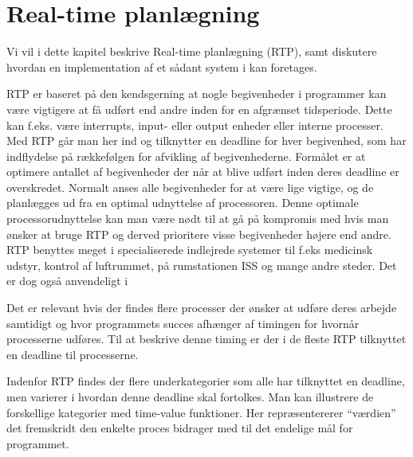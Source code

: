 \chapter{Real-time planlægning}
Vi vil i dette kapitel beskrive Real-time planlægning (RTP), samt diskutere hvordan en implementation af et sådant system i \pycsp kan foretages. 

RTP er baseret på den kendsgerning at nogle begivenheder i programmer kan være vigtigere at få udført end andre inden for en afgrænset tidsperiode. Dette kan f.eks. være interrupts, input- eller output enheder eller interne processer. Med RTP går man her ind og tilknytter en deadline for hver begivenhed, som har indflydelse på rækkefølgen for afvikling af begivenhederne. Formålet er at optimere antallet af begivenheder der når at blive udført inden deres deadline er overskredet. Normalt anses alle begivenheder for at være lige vigtige, og de planlægges ud fra en optimal udnyttelse af processoren. Denne optimale processorudnyttelse kan man være nødt til at gå på kompromis med hvis man ønsker at bruge RTP og derved prioritere visse begivenheder højere end andre. 
RTP benyttes meget i specialiserede indlejrede systemer til f.eks medicinsk udstyr, kontrol af luftrummet, på rumstationen ISS\cite{Audsley1990} og mange andre steder. Det er dog også anvendeligt i 

 Det er  relevant  hvis der findes flere processer der ønsker at udføre deres arbejde samtidigt og hvor programmets succes afhænger af timingen for hvornår processerne udføres. Til at beskrive denne timing er der i de fleste RTP tilknyttet en deadline til processerne.

Indenfor RTP findes der flere underkategorier som alle har tilknyttet en deadline, men varierer i hvordan denne deadline skal fortolkes. Man kan illustrere de forskellige kategorier med time-value funktioner. Her repræsentererer ``værdien'' det fremskridt den enkelte proces bidrager med til det endelige mål for programmet.

